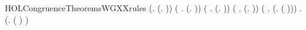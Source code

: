 \newcommand{\HOLCongruenceTheoremsWGXXISXXCONTEXT}{\UseVerbatim{HOLCongruenceTheoremsWGXXISXXCONTEXT}}
\begin{SaveVerbatim}{HOLCongruenceTheoremsWGXXrules}
\HOLTokenTurnstile{} (\HOLSymConst{\HOLTokenForall{}}.  (\HOLTokenLambda{}. )) \HOLSymConst{\HOLTokenConj{}} (\HOLSymConst{\HOLTokenForall{}} .   \HOLSymConst{\HOLTokenImp{}}  (\HOLTokenLambda{}.  )) \HOLSymConst{\HOLTokenConj{}}
   (\HOLSymConst{\HOLTokenForall{}} .   \HOLSymConst{\HOLTokenConj{}}   \HOLSymConst{\HOLTokenImp{}}  (\HOLTokenLambda{}.   \HOLSymConst{+}  )) \HOLSymConst{\HOLTokenConj{}}
   (\HOLSymConst{\HOLTokenForall{}} .   \HOLSymConst{\HOLTokenConj{}}   \HOLSymConst{\HOLTokenImp{}}  (\HOLTokenLambda{}.   \HOLSymConst{\ensuremath{\parallel}}  )) \HOLSymConst{\HOLTokenConj{}}
   (\HOLSymConst{\HOLTokenForall{}} .   \HOLSymConst{\HOLTokenImp{}}  (\HOLTokenLambda{}. \HOLConst{\ensuremath{\nu}}  ( ))) \HOLSymConst{\HOLTokenConj{}}
   \HOLSymConst{\HOLTokenForall{}} .   \HOLSymConst{\HOLTokenImp{}}  (\HOLTokenLambda{}.  ( ) )
\end{SaveVerbatim}
\newcommand{\HOLCongruenceTheoremsWGXXrules}{\UseVerbatim{HOLCongruenceTheoremsWGXXrules}}
